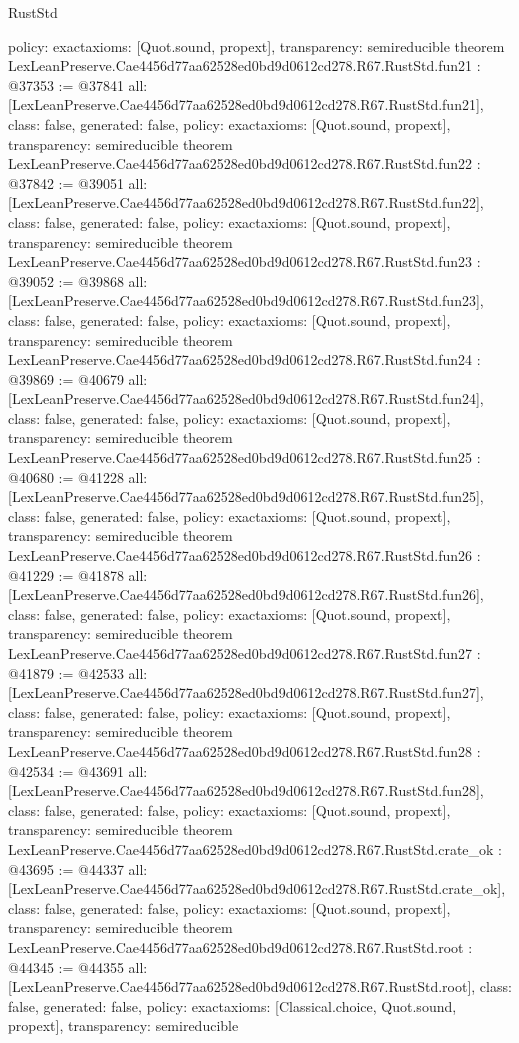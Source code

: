 \begin{lexlean}{RustStd}
\begin{coremodule}
{  policy: exact{axioms: [Quot.sound, propext]},
  transparency: semireducible
}
theorem LexLeanPreserve.Cae4456d77aa62528ed0bd9d0612cd278.R67.RustStd.fun21 : @37353 := @37841 {
  all: [LexLeanPreserve.Cae4456d77aa62528ed0bd9d0612cd278.R67.RustStd.fun21],
  class: false,
  generated: false,
  policy: exact{axioms: [Quot.sound, propext]},
  transparency: semireducible
}
theorem LexLeanPreserve.Cae4456d77aa62528ed0bd9d0612cd278.R67.RustStd.fun22 : @37842 := @39051 {
  all: [LexLeanPreserve.Cae4456d77aa62528ed0bd9d0612cd278.R67.RustStd.fun22],
  class: false,
  generated: false,
  policy: exact{axioms: [Quot.sound, propext]},
  transparency: semireducible
}
theorem LexLeanPreserve.Cae4456d77aa62528ed0bd9d0612cd278.R67.RustStd.fun23 : @39052 := @39868 {
  all: [LexLeanPreserve.Cae4456d77aa62528ed0bd9d0612cd278.R67.RustStd.fun23],
  class: false,
  generated: false,
  policy: exact{axioms: [Quot.sound, propext]},
  transparency: semireducible
}
theorem LexLeanPreserve.Cae4456d77aa62528ed0bd9d0612cd278.R67.RustStd.fun24 : @39869 := @40679 {
  all: [LexLeanPreserve.Cae4456d77aa62528ed0bd9d0612cd278.R67.RustStd.fun24],
  class: false,
  generated: false,
  policy: exact{axioms: [Quot.sound, propext]},
  transparency: semireducible
}
theorem LexLeanPreserve.Cae4456d77aa62528ed0bd9d0612cd278.R67.RustStd.fun25 : @40680 := @41228 {
  all: [LexLeanPreserve.Cae4456d77aa62528ed0bd9d0612cd278.R67.RustStd.fun25],
  class: false,
  generated: false,
  policy: exact{axioms: [Quot.sound, propext]},
  transparency: semireducible
}
theorem LexLeanPreserve.Cae4456d77aa62528ed0bd9d0612cd278.R67.RustStd.fun26 : @41229 := @41878 {
  all: [LexLeanPreserve.Cae4456d77aa62528ed0bd9d0612cd278.R67.RustStd.fun26],
  class: false,
  generated: false,
  policy: exact{axioms: [Quot.sound, propext]},
  transparency: semireducible
}
theorem LexLeanPreserve.Cae4456d77aa62528ed0bd9d0612cd278.R67.RustStd.fun27 : @41879 := @42533 {
  all: [LexLeanPreserve.Cae4456d77aa62528ed0bd9d0612cd278.R67.RustStd.fun27],
  class: false,
  generated: false,
  policy: exact{axioms: [Quot.sound, propext]},
  transparency: semireducible
}
theorem LexLeanPreserve.Cae4456d77aa62528ed0bd9d0612cd278.R67.RustStd.fun28 : @42534 := @43691 {
  all: [LexLeanPreserve.Cae4456d77aa62528ed0bd9d0612cd278.R67.RustStd.fun28],
  class: false,
  generated: false,
  policy: exact{axioms: [Quot.sound, propext]},
  transparency: semireducible
}
theorem LexLeanPreserve.Cae4456d77aa62528ed0bd9d0612cd278.R67.RustStd.crate_ok : @43695 := @44337 {
  all: [LexLeanPreserve.Cae4456d77aa62528ed0bd9d0612cd278.R67.RustStd.crate_ok],
  class: false,
  generated: false,
  policy: exact{axioms: [Quot.sound, propext]},
  transparency: semireducible
}
theorem LexLeanPreserve.Cae4456d77aa62528ed0bd9d0612cd278.R67.RustStd.root : @44345 := @44355 {
  all: [LexLeanPreserve.Cae4456d77aa62528ed0bd9d0612cd278.R67.RustStd.root],
  class: false,
  generated: false,
  policy: exact{axioms: [Classical.choice, Quot.sound, propext]},
  transparency: semireducible
}


\end{coremodule}
\end{lexlean}
